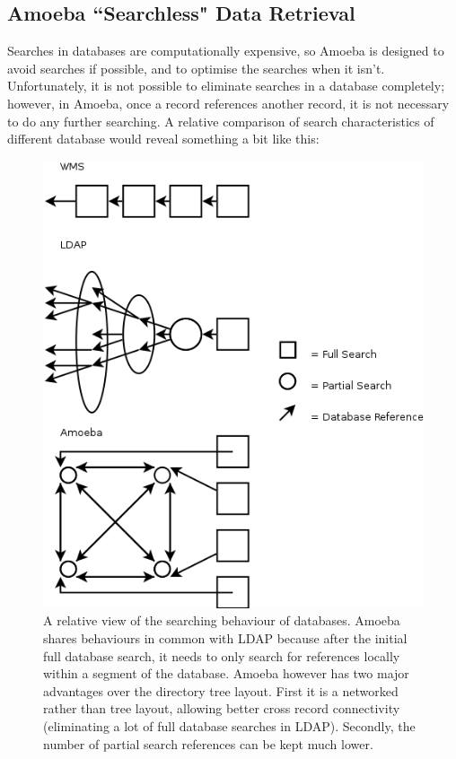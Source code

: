 \documentclass[11pt]{article}
\begin{document}
\subsection{Amoeba ``Searchless" Data Retrieval}
Searches in databases are computationally expensive, so Amoeba is designed to avoid searches if possible, and to optimise the searches when it isn't. Unfortunately, it is not possible to eliminate searches in a database completely; however, in Amoeba, once a record references another record, it is not necessary to do any further searching.
\newline
\newline
A relative comparison of search characteristics of different database would reveal something a bit like this:
\begin{figure}[ht]
\centering
\includegraphics[scale=0.7]{AmoebaSearch1.png}
\caption{A relative view of the searching behaviour of databases. Amoeba shares behaviours in common with LDAP because after the initial full database search, it needs to only search for references locally within a segment of the database. Amoeba however has two major advantages over the directory tree layout. First it is a networked rather than tree layout, allowing better cross record connectivity (eliminating a lot of full database searches in LDAP). Secondly, the number of partial search references can be kept much lower.}
\end{figure}
\newpage
\noindent
\end{document}
